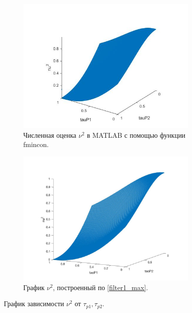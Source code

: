 \documentclass[a4paper,article,14pt]{extarticle}
\begin{document}
\begin{figure}[H]
\begin{subfigure}{.5\textwidth}
  \includegraphics[width=9cm]{images/filter1_exact.jpg}
  \caption{Численная оценка $\nu^2$ в MATLAB с помощью функции fmincon.}
  \label{fig:sub1}
\end{subfigure}%
\begin{subfigure}{.5\textwidth}
\includegraphics[width=9cm]{images/filter1_1.jpg}
  \caption{График $\nu^2$, построенный по \eqref{filter1_max}.}
  \label{fig:sub2}
\end{subfigure}
\caption{График зависимости $\nu^2$ от $\tau_{p1}, \tau_{p2}$.}
\label{fig:filter1_fig}
\end{figure}


\pagebreak
\end{document}
